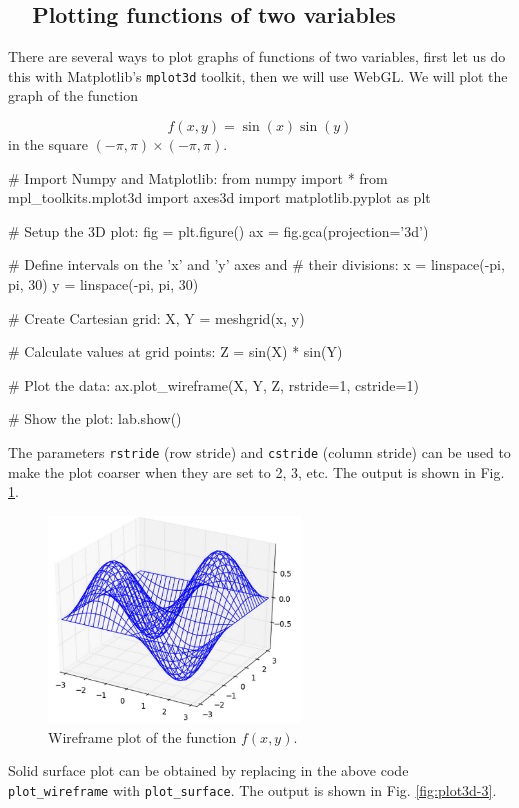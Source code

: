 \subsection{\ \ Plotting functions of two variables}

There are several ways to plot graphs of functions of two variables, 
first let us do this with Matplotlib's {\tt mplot3d} toolkit, then we will
use WebGL. We will plot the graph of the function 

$$
  f(x, y) = \sin(x) \sin(y)
$$
in the square $(-\pi, \pi) \times (-\pi, \pi)$.

\begin{bluecode}
# Import Numpy and Matplotlib:
from numpy import *
from mpl_toolkits.mplot3d import axes3d
import matplotlib.pyplot as plt

# Setup the 3D plot:
fig = plt.figure()
ax = fig.gca(projection='3d')

# Define intervals on the 'x' and 'y' axes and 
# their divisions:
x = linspace(-pi, pi, 30)
y = linspace(-pi, pi, 30)

# Create Cartesian grid:
X, Y = meshgrid(x, y)

# Calculate values at grid points:
Z = sin(X) * sin(Y)

# Plot the data:
ax.plot_wireframe(X, Y, Z, rstride=1, cstride=1)

# Show the plot:
lab.show()
\end{bluecode}
The parameters {\tt rstride} (row stride) and {\tt cstride} (column stride)
can be used to make the plot coarser when they are set to 2, 3, etc.
The output is shown in Fig. \ref{fig:plot3d-2}.
\newpage

\begin{figure}[!ht]
\begin{center}
\includegraphics[width=0.6\textwidth]{imgp/plot3d-2.png}
\end{center}
\vspace{-4mm}
\caption{Wireframe plot of the function $f(x, y)$.}
\label{fig:plot3d-2}
\end{figure}
\noindent
Solid surface plot can be obtained by replacing in the above code 
{\tt plot\_wireframe} with {\tt plot\_surface}. 
The output is shown in Fig. \ref{fig:plot3d-3}.


